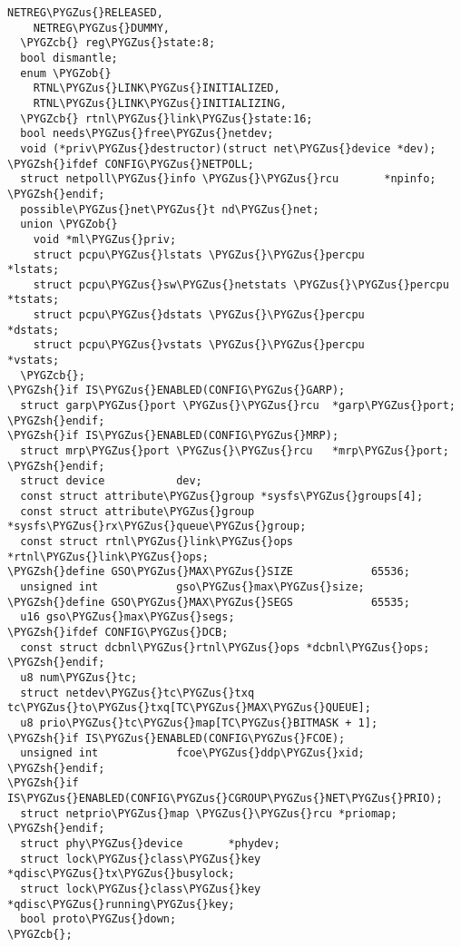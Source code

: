 \documentclass[a4paper,8pt,english]{sphinxmanual}
\def\PYGZus{\char`\_}
\def\PYGZob{\char`\{}
\def\PYGZcb{\char`\}}
\def\PYGZsh{\char`\#}
\begin{document}
\begin{Verbatim}[commandchars=\\\{\}]
    NETREG\PYGZus{}RELEASED,
    NETREG\PYGZus{}DUMMY,
  \PYGZcb{} reg\PYGZus{}state:8;
  bool dismantle;
  enum \PYGZob{}
    RTNL\PYGZus{}LINK\PYGZus{}INITIALIZED,
    RTNL\PYGZus{}LINK\PYGZus{}INITIALIZING,
  \PYGZcb{} rtnl\PYGZus{}link\PYGZus{}state:16;
  bool needs\PYGZus{}free\PYGZus{}netdev;
  void (*priv\PYGZus{}destructor)(struct net\PYGZus{}device *dev);
\PYGZsh{}ifdef CONFIG\PYGZus{}NETPOLL;
  struct netpoll\PYGZus{}info \PYGZus{}\PYGZus{}rcu       *npinfo;
\PYGZsh{}endif;
  possible\PYGZus{}net\PYGZus{}t nd\PYGZus{}net;
  union \PYGZob{}
    void *ml\PYGZus{}priv;
    struct pcpu\PYGZus{}lstats \PYGZus{}\PYGZus{}percpu             *lstats;
    struct pcpu\PYGZus{}sw\PYGZus{}netstats \PYGZus{}\PYGZus{}percpu        *tstats;
    struct pcpu\PYGZus{}dstats \PYGZus{}\PYGZus{}percpu             *dstats;
    struct pcpu\PYGZus{}vstats \PYGZus{}\PYGZus{}percpu             *vstats;
  \PYGZcb{};
\PYGZsh{}if IS\PYGZus{}ENABLED(CONFIG\PYGZus{}GARP);
  struct garp\PYGZus{}port \PYGZus{}\PYGZus{}rcu  *garp\PYGZus{}port;
\PYGZsh{}endif;
\PYGZsh{}if IS\PYGZus{}ENABLED(CONFIG\PYGZus{}MRP);
  struct mrp\PYGZus{}port \PYGZus{}\PYGZus{}rcu   *mrp\PYGZus{}port;
\PYGZsh{}endif;
  struct device           dev;
  const struct attribute\PYGZus{}group *sysfs\PYGZus{}groups[4];
  const struct attribute\PYGZus{}group *sysfs\PYGZus{}rx\PYGZus{}queue\PYGZus{}group;
  const struct rtnl\PYGZus{}link\PYGZus{}ops *rtnl\PYGZus{}link\PYGZus{}ops;
\PYGZsh{}define GSO\PYGZus{}MAX\PYGZus{}SIZE            65536;
  unsigned int            gso\PYGZus{}max\PYGZus{}size;
\PYGZsh{}define GSO\PYGZus{}MAX\PYGZus{}SEGS            65535;
  u16 gso\PYGZus{}max\PYGZus{}segs;
\PYGZsh{}ifdef CONFIG\PYGZus{}DCB;
  const struct dcbnl\PYGZus{}rtnl\PYGZus{}ops *dcbnl\PYGZus{}ops;
\PYGZsh{}endif;
  u8 num\PYGZus{}tc;
  struct netdev\PYGZus{}tc\PYGZus{}txq    tc\PYGZus{}to\PYGZus{}txq[TC\PYGZus{}MAX\PYGZus{}QUEUE];
  u8 prio\PYGZus{}tc\PYGZus{}map[TC\PYGZus{}BITMASK + 1];
\PYGZsh{}if IS\PYGZus{}ENABLED(CONFIG\PYGZus{}FCOE);
  unsigned int            fcoe\PYGZus{}ddp\PYGZus{}xid;
\PYGZsh{}endif;
\PYGZsh{}if IS\PYGZus{}ENABLED(CONFIG\PYGZus{}CGROUP\PYGZus{}NET\PYGZus{}PRIO);
  struct netprio\PYGZus{}map \PYGZus{}\PYGZus{}rcu *priomap;
\PYGZsh{}endif;
  struct phy\PYGZus{}device       *phydev;
  struct lock\PYGZus{}class\PYGZus{}key   *qdisc\PYGZus{}tx\PYGZus{}busylock;
  struct lock\PYGZus{}class\PYGZus{}key   *qdisc\PYGZus{}running\PYGZus{}key;
  bool proto\PYGZus{}down;
\PYGZcb{};
\end{Verbatim}
\end{document}
